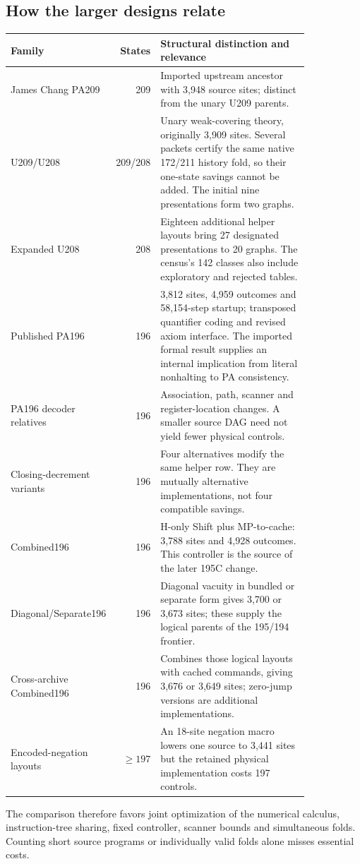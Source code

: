 \documentclass[11pt,letterpaper]{article}
\begin{document}
\subsection{How the larger designs relate}

\begin{longtable}{@{}p{0.22\linewidth}rp{0.62\linewidth}@{}}
\toprule Family & States & Structural distinction and relevance\\\midrule\endhead
James Chang PA209 &209&Imported upstream ancestor with 3,948 source sites; distinct from the unary U209 parents.\\[0.4em]
U209/U208 &209/208&Unary weak-covering theory, originally 3,909 sites. Several packets certify the same native 172/211 history fold, so their one-state savings cannot be added. The initial nine presentations form two graphs.\\[0.4em]
Expanded U208 &208&Eighteen additional helper layouts bring 27 designated presentations to 20 graphs. The census's 142 classes also include exploratory and rejected tables.\\[0.4em]
Published PA196 &196&3,812 sites, 4,959 outcomes and 58,154-step startup; transposed quantifier coding and revised axiom interface. The imported formal result supplies an internal implication from literal nonhalting to PA consistency.\\[0.4em]
PA196 decoder relatives &196&Association, path, scanner and register-location changes. A smaller source DAG need not yield fewer physical controls.\\[0.4em]
Closing-decrement variants &196&Four alternatives modify the same helper row. They are mutually alternative implementations, not four compatible savings.\\[0.4em]
Combined196 &196&H-only Shift plus MP-to-cache: 3,788 sites and 4,928 outcomes. This controller is the source of the later 195C change.\\[0.4em]
Diagonal/Separate196 &196&Diagonal vacuity in bundled or separate form gives 3,700 or 3,673 sites; these supply the logical parents of the 195/194 frontier.\\[0.4em]
Cross-archive Combined196 &196&Combines those logical layouts with cached commands, giving 3,676 or 3,649 sites; zero-jump versions are additional implementations.\\[0.4em]
Encoded-negation layouts &$\ge197$&An 18-site negation macro lowers one source to 3,441 sites but the retained physical implementation costs 197 controls.\\
\bottomrule
\end{longtable}
The comparison therefore favors joint optimization of the numerical
calculus, instruction-tree sharing, fixed controller, scanner bounds and
simultaneous folds. Counting short source programs or individually valid
folds alone misses essential costs.
\end{document}
